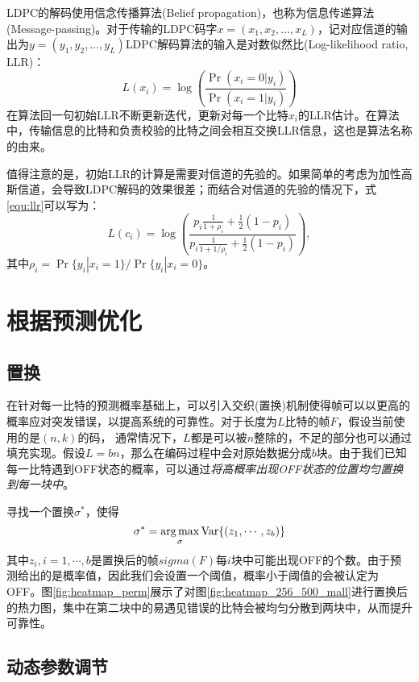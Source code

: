 LDPC的解码使用信念传播算法(Belief propagation)，也称为信息传递算法(Message-passing)。对于传输的LDPC码字$x = (x_1, x_2, …, x_{L})$，记对应信道的输出为$y = (y_1, y_2, …, y_{L})$LDPC解码算法的输入是对数似然比(Log-likelihood ratio, LLR)：
\begin{equation}
\label{equ:llr}
L(x_i)=\log\left(\frac{\Pr(x_i=0|y_i)}{\Pr(x_i=1|y_i)}\right)
\end{equation}
在算法回一句初始LLR不断更新迭代，更新对每一个比特$x_i$的LLR估计。在算法中，传输信息的比特和负责校验的比特之间会相互交换LLR信息，这也是算法名称的由来。

值得注意的是，初始LLR的计算是需要对信道的先验的。如果简单的考虑为加性高斯信道，会导致LDPC解码的效果很差；而结合对信道的先验的情况下，式\ref{equ:llr}可以写为：
\begin{equation}
\label{equ:llr_new}
L(c_i)=\log\left(\frac{ p_i \frac{1}{1+\rho_i} + \frac{1}{2} (1-p_i) }{ p_i \frac{1}{1+1/\rho_i} + \frac{1}{2} (1-p_i)  }\right),
\end{equation}
其中$\rho_i = \Pr\{y_i|x_i=1\}/\Pr\{y_i|x_i=0\}$。
\section{根据预测优化}

\subsection{置换}
\label{subsec:perm}
在针对每一比特的预测概率基础上，可以引入交织(置换)机制使得帧可以以更高的概率应对突发错误，以提高系统的可靠性。对于长度为$L$比特的帧$F$，假设当前使用的是$(n,k)$的码，
通常情况下，$L$都是可以被$n$整除的，不足的部分也可以通过填充实现。假设$L = bn$，那么在编码过程中会对原始数据分成$b$块。由于我们已知每一比特遇到OFF状态的概率，可以通过\emph{将高概率出现OFF状态的位置均匀置换到每一块中}。

寻找一个置换$\sigma^\ast$，使得
\begin{equation}
\sigma^\ast = \operatorname*{arg\,max}_\sigma \mathrm{Var} \{ (z_1, \cdots, z_b) \} 
\end{equation}
其中$z_i, i = 1,\cdots,b$是置换后的帧$sigma(F)$每$i$块中可能出现OFF的个数。由于预测给出的是概率值，因此我们会设置一个阈值，概率小于阈值的会被认定为OFF。图\ref{fig:heatmap_perm}展示了对图\ref{fig:heatmap_256_500_mall}进行置换后的热力图，集中在第二块中的易遇见错误的比特会被均匀分散到两块中，从而提升可靠性。

\subsection{动态参数调节}

